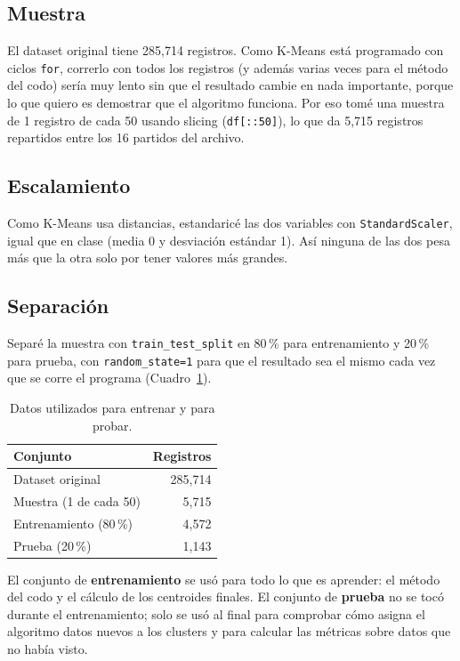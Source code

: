 \documentclass[11pt,a4paper]{article}
\begin{document}
\subsection{Muestra}

El dataset original tiene 285{,}714 registros. Como K-Means está programado con ciclos \texttt{for}, correrlo con todos los registros (y además varias veces para el método del codo) sería muy lento sin que el resultado cambie en nada importante, porque lo que quiero es demostrar que el algoritmo funciona. Por eso tomé una muestra de 1 registro de cada 50 usando slicing (\texttt{df[::50]}), lo que da 5{,}715 registros repartidos entre los 16 partidos del archivo.

\subsection{Escalamiento}

Como K-Means usa distancias, estandaricé las dos variables con \texttt{StandardScaler}, igual que en clase (media 0 y desviación estándar 1). Así ninguna de las dos pesa más que la otra solo por tener valores más grandes.

\subsection{Separación}

Separé la muestra con \texttt{train\_test\_split} en 80\,\% para entrenamiento y 20\,\% para prueba, con \texttt{random\_state=1} para que el resultado sea el mismo cada vez que se corre el programa (Cuadro~\ref{tab:split}).

\begin{table}[H]
  \centering
  \begin{tabular}{lr}
    \toprule
    Conjunto & Registros \\
    \midrule
    Dataset original & 285{,}714 \\
    Muestra (1 de cada 50) & 5{,}715 \\
    Entrenamiento (80\,\%) & 4{,}572 \\
    Prueba (20\,\%) & 1{,}143 \\
    \bottomrule
  \end{tabular}
  \caption{Datos utilizados para entrenar y para probar.}
  \label{tab:split}
\end{table}

El conjunto de \textbf{entrenamiento} se usó para todo lo que es aprender: el método del codo y el cálculo de los centroides finales. El conjunto de \textbf{prueba} no se tocó durante el entrenamiento; solo se usó al final para comprobar cómo asigna el algoritmo datos nuevos a los clusters y para calcular las métricas sobre datos que no había visto.
\end{document}
